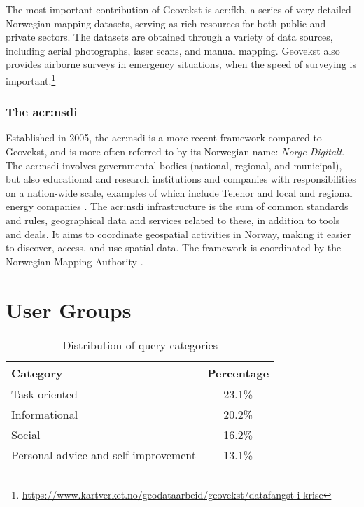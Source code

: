 The most important contribution of Geovekst is \gls{acr:fkb}, a series of very detailed Norwegian mapping datasets, serving as rich resources for both public and private sectors. The datasets are obtained through a variety of data sources, including aerial photographs, laser scans, and manual mapping. Geovekst also provides airborne surveys in emergency situations, when the speed of surveying is important.\footnote{\url{https://www.kartverket.no/geodataarbeid/geovekst/datafangst-i-krise}}

\subsubsection[The National Spatial Data Infrastructure]{The \acrlong{acr:nsdi}}\label{subsubsec:norge-digitalt}

Established in 2005, the \gls{acr:nsdi} is a more recent framework compared to Geovekst, and is more often referred to by its Norwegian name: \textit{Norge Digitalt}. The \gls{acr:nsdi} involves governmental bodies (national, regional, and municipal), but also educational and research institutions and companies with responsibilities on a nation-wide scale, examples of which include Telenor and local and regional energy companies \citep[6]{norgedigitaltGenerelleVilkarNorge2023}. The \gls{acr:nsdi} infrastructure is the sum of common standards and rules, geographical data and services related to these, in addition to tools and deals. It aims to coordinate geospatial activities in Norway, making it easier to discover, access, and use spatial data. The framework is coordinated by the Norwegian Mapping Authority \citep{norgedigitaltGenerelleVilkarNorge2023}.



\section{User Groups}\label{sec:user-groups}

\begin{table}[ht]
    \centering
    \begin{tabular}{l|c}
        \toprule
        \textbf{Category}                    & \textbf{Percentage} \\
        \midrule
        Task oriented                        & 23.1\%              \\
        Informational                        & 20.2\%              \\
        Social                               & 16.2\%              \\
        Personal advice and self-improvement & 13.1\%              \\
        \bottomrule
    \end{tabular}
    \caption{Distribution of query categories \citep{kumarWhatArePeople2023a}}
    \label{tbl:query-category-distribution}
\end{table}

